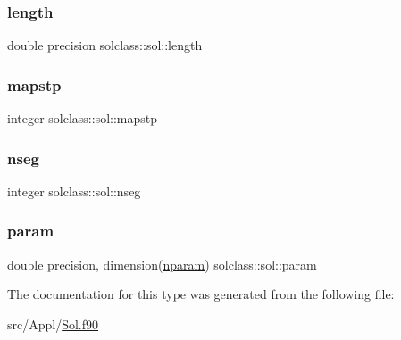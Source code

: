 \subsubsection{\texorpdfstring{length}{length}}
{\footnotesize\ttfamily double precision solclass\+::sol\+::length}

\mbox{\label{structsolclass_1_1sol_a3821a5713cb3e0e9ae5359b42644b860}} 
\subsubsection{\texorpdfstring{mapstp}{mapstp}}
{\footnotesize\ttfamily integer solclass\+::sol\+::mapstp}

\mbox{\label{structsolclass_1_1sol_a4e0b71eae9d2072fd83b1a4e524da7fc}} 
\subsubsection{\texorpdfstring{nseg}{nseg}}
{\footnotesize\ttfamily integer solclass\+::sol\+::nseg}

\mbox{\label{structsolclass_1_1sol_a70efaac352dbf744000a92effd3d814b}} 
\subsubsection{\texorpdfstring{param}{param}}
{\footnotesize\ttfamily double precision, dimension(\mbox{\hyperlink{namespacesolclass_abb5af39a08a5ff2cbe713621b2727eaf}{nparam}}) solclass\+::sol\+::param}



The documentation for this type was generated from the following file\+:\begin{DoxyCompactItemize}
\item 
src/\+Appl/\mbox{\hyperlink{_sol_8f90}{Sol.\+f90}}\end{DoxyCompactItemize}
